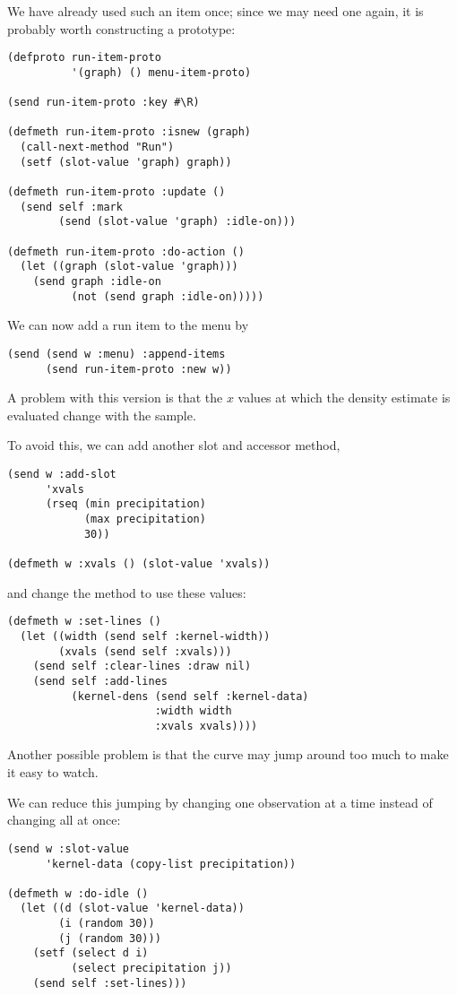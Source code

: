 \begin{slide}{}
We have already used such an item once; since we may need one again,
it is probably worth constructing a prototype:
{\Large
\begin{verbatim}
(defproto run-item-proto
          '(graph) () menu-item-proto)

(send run-item-proto :key #\R)

(defmeth run-item-proto :isnew (graph)
  (call-next-method "Run")
  (setf (slot-value 'graph) graph))

(defmeth run-item-proto :update ()
  (send self :mark
        (send (slot-value 'graph) :idle-on)))

(defmeth run-item-proto :do-action ()
  (let ((graph (slot-value 'graph)))
    (send graph :idle-on
          (not (send graph :idle-on)))))
\end{verbatim}}
We can now add a run item to the menu by
{\Large
\begin{verbatim} 
(send (send w :menu) :append-items
      (send run-item-proto :new w))
\end{verbatim}}
\end{slide}

\begin{slide}{}
A problem with this version is that the $x$ values at which the density
estimate is evaluated change with the sample.

To avoid this, we can add another slot and accessor method,
{\Large
\begin{verbatim}
(send w :add-slot
      'xvals 
      (rseq (min precipitation)
            (max precipitation)
            30))

(defmeth w :xvals () (slot-value 'xvals))
\end{verbatim}}
and change the  method to use these values:
{\Large
\begin{verbatim}
(defmeth w :set-lines ()
  (let ((width (send self :kernel-width))
        (xvals (send self :xvals)))
    (send self :clear-lines :draw nil)
    (send self :add-lines
          (kernel-dens (send self :kernel-data)
                       :width width
                       :xvals xvals))))
\end{verbatim}}
\end{slide}

\begin{slide}{}
Another possible problem is that the curve may jump around too
much to make it easy to watch.

We can reduce this jumping by changing one observation at a time
instead of changing all at once:
{\Large
\begin{verbatim}
(send w :slot-value
      'kernel-data (copy-list precipitation))

(defmeth w :do-idle ()
  (let ((d (slot-value 'kernel-data))
        (i (random 30))
        (j (random 30)))
    (setf (select d i)
          (select precipitation j))
    (send self :set-lines)))
\end{verbatim}}
\end{slide}

